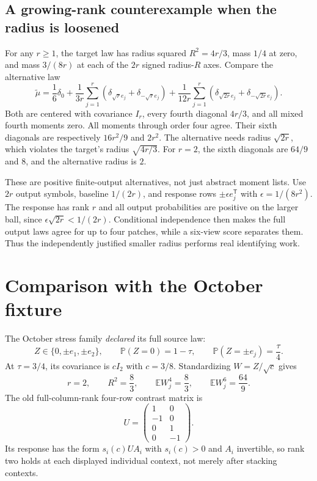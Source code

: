 \documentclass[11pt]{article}
\theoremstyle{definition}
\theoremstyle{remark}
\newcommand{\E}{\mathbb E}
\newcommand{\Prob}{\mathbb P}
\newcommand{\trans}{\mathsf T}
\begin{document}
\subsection{A growing-rank counterexample when the radius is loosened}

For any $r\ge1$, the target law has radius squared $R^2=4r/3$, mass
$1/4$ at zero, and mass $3/(8r)$ at each of the $2r$ signed radius-$R$
axes. Compare the alternative law
\begin{equation}
\widetilde\mu=\frac16\delta_0+
\frac1{3r}\sum_{j=1}^r(\delta_{\sqrt r e_j}+\delta_{-\sqrt r e_j})+
\frac1{12r}\sum_{j=1}^r
(\delta_{\sqrt{2r}e_j}+\delta_{-\sqrt{2r}e_j}).
\label{eq:radius-alternative}
\end{equation}
Both are centered with covariance $I_r$, every fourth diagonal $4r/3$,
and all mixed fourth moments zero. All moments through order four agree.
Their sixth diagonals are respectively $16r^2/9$ and $2r^2$.
The alternative needs radius $\sqrt{2r}$, which violates the target's
radius $\sqrt{4r/3}$. For $r=2$, the sixth diagonals are $64/9$ and $8$,
and the alternative radius is $2$.

These are positive finite-output alternatives, not just abstract moment
lists. Use $2r$ output symbols, baseline $1/(2r)$, and response rows
$\pm\epsilon e_j^\trans$ with $\epsilon=1/(8r^2)$. The response has rank
$r$ and all output probabilities are positive on the larger ball, since
$\epsilon\sqrt{2r}<1/(2r)$. Conditional independence then makes the full
output laws agree for up to four patches, while a six-view score
separates them. Thus the independently justified smaller radius performs
real identifying work.

\section{Comparison with the October fixture}
\label{sec:october}

The October stress family \emph{declared} its full source law:
\begin{equation}
Z\in\{0,\pm e_1,\pm e_2\},\qquad
\Prob(Z=0)=1-\tau,\qquad
\Prob(Z=\pm e_j)=\frac\tau4.
\label{eq:old-law}
\end{equation}
At $\tau=3/4$, its covariance is $cI_2$ with $c=3/8$. Standardizing
$W=Z/\sqrt c$ gives
\begin{equation}
r=2,\qquad R^2=\frac83,\qquad
\E W_j^4=\frac83,\qquad \E W_j^6=\frac{64}9.
\label{eq:old-values}
\end{equation}
The old full-column-rank four-row contrast matrix is
\begin{equation}
U=\begin{pmatrix}1&0\\-1&0\\0&1\\0&-1\end{pmatrix}.
\label{eq:old-U}
\end{equation}
Its response has the form $s_i(c)UA_i$ with $s_i(c)>0$ and $A_i$
invertible, so rank two holds at each displayed individual context,
not merely after stacking contexts.
\end{document}
